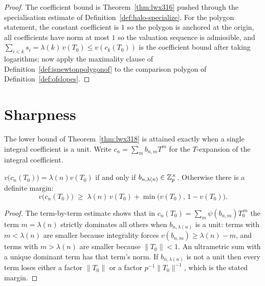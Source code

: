 \begin{proof}
  \leanok
  The coefficient bound is Theorem~\ref{thm:lwx316} pushed through the specialisation estimate of
  Definition~\ref{def:halo-specialize}.  For the polygon statement, the constant coefficient is
  $1$ so the polygon is anchored at the origin, all coefficients have norm at most $1$ so the
  valuation sequence is admissible, and $\sum_{i<k}s_i = \lambda(k)\,v(T_0) \leq
  v(c_k(T_0))$ is the coefficient bound after taking logarithms; now apply the maximality clause
  of Definition~\ref{def:isnewtonpolygonof} to the comparison polygon of
  Definition~\ref{def:ofslopes}.
\end{proof}

\section{Sharpness}

The lower bound of Theorem~\ref{thm:lwx318} is attained exactly when a single integral
coefficient is a unit.  Write $c_n = \sum_m b_{n,m}T^{m}$ for the $T$-expansion of the integral
coefficient.

\begin{theorem}
  \label{thm:lwx-sharp}
  \leanok
  $v\bigl(c_n(T_0)\bigr) = \lambda(n)v(T_0)$ if and only if $b_{n,\lambda(n)} \in \mathbb{Z}_p^{\times}$.
  Otherwise there is a definite margin:
  \[
    v\bigl(c_n(T_0)\bigr) \;\geq\; \lambda(n)\,v(T_0) + \min\bigl(v(T_0),\, 1-v(T_0)\bigr).
  \]
\end{theorem}

\begin{proof}
  \leanok
  The term-by-term estimate \cite[(3.18.1)]{LWX} shows that in
  $c_n(T_0) = \sum_m \psi(b_{n,m})T_0^{\,m}$ the term $m = \lambda(n)$ strictly dominates all
  others when $b_{n,\lambda(n)}$ is a unit: terms with $m < \lambda(n)$ are smaller because
  integrality forces $v(b_{n,m}) \geq \lambda(n)-m$, and terms with $m > \lambda(n)$ are smaller
  because $\lVert T_0\rVert<1$.  An ultrametric sum with a unique dominant term has that term's
  norm.  If $b_{n,\lambda(n)}$ is not a unit then every term loses either a factor
  $\lVert T_0\rVert$ or a factor $p^{-1}\lVert T_0\rVert^{-1}$, which is the stated margin.
\end{proof}

